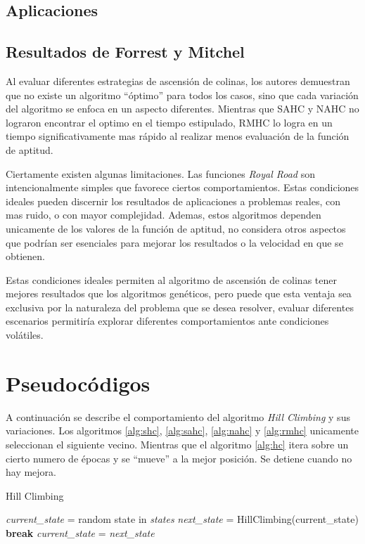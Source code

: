\documentclass[12pt,twoside]{article}
\begin{document}
	\subsection{Aplicaciones}
	
	\subsection{Resultados de Forrest y Mitchel}

	Al evaluar diferentes estrategias de ascensión de colinas, los autores demuestran que no existe un algoritmo ``óptimo'' para todos los casos, sino que cada variación del algoritmo se enfoca en un aspecto diferentes. Mientras que SAHC y NAHC no lograron encontrar el optimo en el tiempo estipulado, RMHC lo logra en un tiempo significativamente mas rápido al realizar menos evaluación de la función de aptitud.
	
	Ciertamente existen  algunas limitaciones. Las funciones \textit{Royal Road} son intencionalmente simples que favorece ciertos comportamientos. Estas condiciones ideales pueden discernir los resultados de aplicaciones a problemas reales, con mas ruido, o con mayor complejidad. Ademas, estos algoritmos dependen unicamente de los valores de la función de aptitud, no considera otros aspectos que podrían ser esenciales para mejorar los resultados o la velocidad en que se obtienen.
	
	Estas condiciones ideales permiten al algoritmo de ascensión de colinas tener mejores resultados que los algoritmos genéticos, pero puede que esta ventaja sea exclusiva por la naturaleza del problema que se desea resolver, evaluar diferentes escenarios permitiría explorar diferentes comportamientos ante condiciones volátiles.


	\clearpage
	\section{Pseudocódigos}
	
	A continuación se describe el comportamiento del algoritmo \textit{Hill Climbing} y sus variaciones. Los algoritmos \ref{alg:shc}, \ref{alg:sahc}, \ref{alg:nahc} y \ref{alg:rmhc} unicamente seleccionan el siguiente vecino. Mientras que el algoritmo \ref{alg:hc} itera sobre un cierto numero de épocas y se ``mueve'' a la mejor posición. Se detiene cuando no hay mejora.
	
	\begin{algorithm}[H]
		\caption{Hill Climbing}
		\begin{algorithmic}[1]
			\State \textit{current\_state} = random state in \textit{states}
			\State \textit{next\_state} = HillClimbing(current\_state)
			\State \textbf{break}
			\EndIf 
			\State \textit{current\_state} = \textit{next\_state}
			\EndFor\\
		\end{algorithmic}
		\label{alg:hc}
	\end{algorithm}
	
\end{document}
